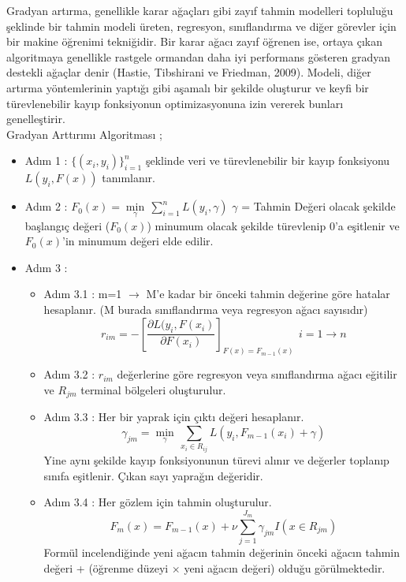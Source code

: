 \documentclass[12pt,twoside]{deuthesis}
\begin{document}
Gradyan artırma, genellikle karar ağaçları gibi zayıf tahmin modelleri topluluğu şeklinde bir tahmin modeli üreten, regresyon, sınıflandırma ve diğer görevler için bir makine öğrenimi tekniğidir. Bir karar ağacı zayıf öğrenen ise, ortaya çıkan algoritmaya genellikle rastgele ormandan daha iyi performans gösteren gradyan destekli ağaçlar denir (Hastie, Tibshirani ve Friedman, 2009). Modeli, diğer artırma yöntemlerinin yaptığı gibi aşamalı bir şekilde oluşturur ve keyfi bir türevlenebilir kayıp fonksiyonun optimizasyonuna izin vererek bunları genelleştirir.\\
Gradyan Arttırımı Algoritması ;
\begin{itemize}
\item
  Adım 1 : \(\{(x_i,y_i)\}_{i=1}^n\) şeklinde veri ve türevlenebilir bir kayıp fonksiyonu \(L(y_i,F(x))\) tanımlanır.
\item
  Adım 2 : \(F_0(x) = \min\limits_{\gamma}\,\sum_{i=1}^{n}L(y_i,\gamma)\) \(\gamma\) = Tahmin Değeri olacak şekilde başlangıç değeri (\(F_0(x)\)) minumum olacak şekilde türevlenip 0'a eşitlenir ve \(F_0(x)\)'in minumum değeri elde edilir.
\item
  Adım 3 :
  \begin{itemize}
  \item
    Adım 3.1 : m=1 \(\to\) M'e kadar bir önceki tahmin değerine göre hatalar hesaplanır. (M burada sınıflandırma veya regresyon ağacı sayısıdır)
    \[r_{im} = -\left[\frac{\partial L(y_i,F(x_i)}{\partial F(x_i)}\right]_{F(x)=F_{m-1}(x)}\:\,i=1 \to n\]
  \item
    Adım 3.2 : \(r_{im}\) değerlerine göre regresyon veya sınıflandırma ağacı eğitilir ve \(R_{jm}\) terminal bölgeleri oluşturulur.
  \item
    Adım 3.3 : Her bir yaprak için çıktı değeri hesaplanır.
    \[\gamma_{jm} = \min\limits_{\gamma}\,\sum_{x_i\in R_{ij}}L(y_i,F_{m-1}(x_i)+\gamma)\]
    Yine aynı şekilde kayıp fonksiyonunun türevi alınır ve değerler toplanıp sınıfa eşitlenir. Çıkan sayı yaprağın değeridir.
  \item
    Adım 3.4 : Her gözlem için tahmin oluşturulur.
    \[F_m(x) = F_{m-1}(x) + \nu\sum_{j=1}^{J_m}\gamma_{jm}I(x\in R_{jm})\]
    Formül incelendiğinde yeni ağacın tahmin değerinin önceki ağacın tahmin değeri + (öğrenme düzeyi \(\times\) yeni ağacın değeri) olduğu görülmektedir.
  \end{itemize}
\end{itemize}
\end{document}
